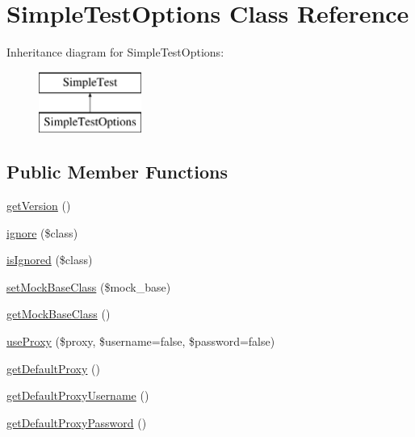 \hypertarget{class_simple_test_options}{
\section{SimpleTestOptions Class Reference}
\label{class_simple_test_options}
}
Inheritance diagram for SimpleTestOptions:\begin{figure}[H]
\begin{center}
\leavevmode
\includegraphics[height=2.000000cm]{class_simple_test_options}
\end{center}
\end{figure}
\subsection*{Public Member Functions}
\begin{DoxyCompactItemize}
\item 
\hyperlink{class_simple_test_options_a187d2d7c509d83c6b25e6dcc0e2f8a1e}{getVersion} ()
\item 
\hyperlink{class_simple_test_options_af46d33a1d67a45e554dce91b44d78aed}{ignore} (\$class)
\item 
\hyperlink{class_simple_test_options_a5a043e7e1dd2070601d53a5282f8787e}{isIgnored} (\$class)
\item 
\hyperlink{class_simple_test_options_abd99206b992d90ce1de9edbf4efceabb}{setMockBaseClass} (\$mock\_\-base)
\item 
\hyperlink{class_simple_test_options_a9059697594290ad1e01e7cf5d2e6237c}{getMockBaseClass} ()
\item 
\hyperlink{class_simple_test_options_a6d722d3083d23b8ad3a59813aba88bb4}{useProxy} (\$proxy, \$username=false, \$password=false)
\item 
\hyperlink{class_simple_test_options_abc355e97139c010dce4d0fbe181a1cfe}{getDefaultProxy} ()
\item 
\hyperlink{class_simple_test_options_a5f3b3d362318bcc9fb3da67c25229dde}{getDefaultProxyUsername} ()
\item 
\hyperlink{class_simple_test_options_ac0c29d1f79a425dc7053d9269b63f1f6}{getDefaultProxyPassword} ()
\end{DoxyCompactItemize}


